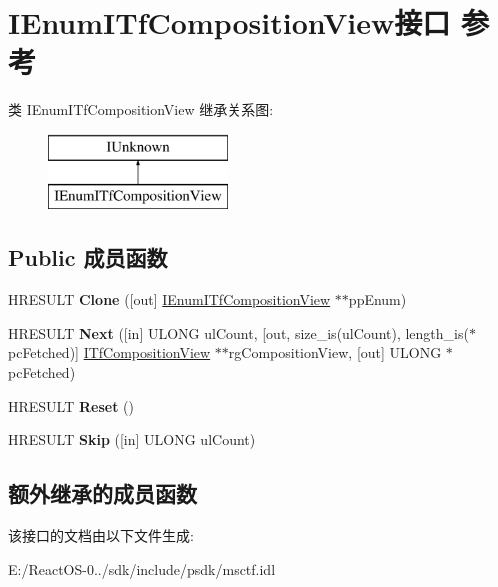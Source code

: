 \hypertarget{interface_i_enum_i_tf_composition_view}{}\section{I\+Enum\+I\+Tf\+Composition\+View接口 参考}
\label{interface_i_enum_i_tf_composition_view}
类 I\+Enum\+I\+Tf\+Composition\+View 继承关系图\+:\begin{figure}[H]
\begin{center}
\leavevmode
\includegraphics[height=2.000000cm]{interface_i_enum_i_tf_composition_view}
\end{center}
\end{figure}
\subsection*{Public 成员函数}
\begin{DoxyCompactItemize}
\item 
\mbox{\label{interface_i_enum_i_tf_composition_view_aaa8c597bd5cf49d5f2b5a1ea2704b598}} 
H\+R\+E\+S\+U\+LT {\bfseries Clone} (\mbox{[}out\mbox{]} \hyperlink{interface_i_enum_i_tf_composition_view}{I\+Enum\+I\+Tf\+Composition\+View} $\ast$$\ast$pp\+Enum)
\item 
\mbox{\label{interface_i_enum_i_tf_composition_view_a2b4511137d150f3bbcd27f6406e8bd11}} 
H\+R\+E\+S\+U\+LT {\bfseries Next} (\mbox{[}in\mbox{]} U\+L\+O\+NG ul\+Count, \mbox{[}out, size\+\_\+is(ul\+Count), length\+\_\+is($\ast$pc\+Fetched)\mbox{]} \hyperlink{interface_i_tf_composition_view}{I\+Tf\+Composition\+View} $\ast$$\ast$rg\+Composition\+View, \mbox{[}out\mbox{]} U\+L\+O\+NG $\ast$pc\+Fetched)
\item 
\mbox{\label{interface_i_enum_i_tf_composition_view_adcee0285f9862bd19490dd2032d1e88d}} 
H\+R\+E\+S\+U\+LT {\bfseries Reset} ()
\item 
\mbox{\label{interface_i_enum_i_tf_composition_view_a46626476e18522b3567a7b537bd12ddd}} 
H\+R\+E\+S\+U\+LT {\bfseries Skip} (\mbox{[}in\mbox{]} U\+L\+O\+NG ul\+Count)
\end{DoxyCompactItemize}
\subsection*{额外继承的成员函数}


该接口的文档由以下文件生成\+:\begin{DoxyCompactItemize}
\item 
E\+:/\+React\+O\+S-\/0../sdk/include/psdk/msctf.\+idl\end{DoxyCompactItemize}
